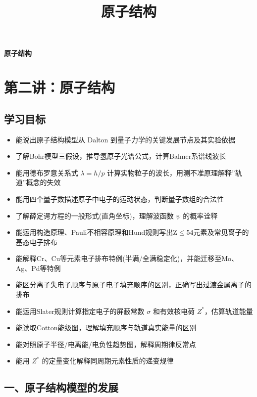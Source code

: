 \documentclass[a4paper,11pt]{ctexart}
\title{原子结构}
\date{}
\providecommand{\tightlist}{\setlength{\itemsep}{0pt}\setlength{\parskip}{0pt}}
\newcommand{\箭}{\ensuremath{\rightarrow}}
\newcommand{\左箭}{\ensuremath{\leftarrow}}
\newcommand{\上箭}{\ensuremath{\uparrow}}
\newcommand{\下箭}{\ensuremath{\downarrow}}
\newcommand{\衡}{\ensuremath{\rightleftharpoons}}
\newcommand{\双箭}{\ensuremath{\leftrightarrow}}
\newcommand{\约等于}{\ensuremath{\approx}}
\newcommand{\小于等于}{\ensuremath{\leq}}
\newcommand{\大于等于}{\ensuremath{\geq}}
\newcommand{\不等于}{\ensuremath{\neq}}
\newcommand{\西格马}{\ensuremath{\sigma}}
\newcommand{\派}{\ensuremath{\pi}}
\begin{document}
\thispagestyle{plain}
\begin{center}
{\bfseries 原子结构\par}
\end{center}
\vspace{1em}
\section{第二讲：原子结构}\label{ux7b2cux4e8cux8bb2ux539fux5b50ux7ed3ux6784}

\subsection{学习目标}\label{ux5b66ux4e60ux76eeux6807}

\begin{itemize}
\tightlist
\item
  能说出原子结构模型从 Dalton 到量子力学的关键发展节点及其实验依据
\item
  了解Bohr模型三假设，推导氢原子光谱公式，计算Balmer系谱线波长
\item
  能用德布罗意关系式 \(\lambda = h/p\) 计算实物粒子的波长，用测不准原理解释''轨道''概念的失效
\item
  能用四个量子数描述原子中电子的运动状态，判断量子数组的合法性
\item
  了解薛定谔方程的一般形式(直角坐标)，理解波函数 \(\psi\) 的概率诠释
\item
  能运用构造原理、Pauli不相容原理和Hund规则写出Z\小于等于54元素及常见离子的基态电子排布
\item
  能解释Cr、Cu等元素电子排布特例(半满/全满稳定化)，并能迁移至Mo、Ag、Pd等特例
\item
  能区分离子失电子顺序与原子电子填充顺序的区别，正确写出过渡金属离子的排布
\item
  能运用Slater规则计算指定电子的屏蔽常数 \(\sigma\) 和有效核电荷 \(Z^*\)，估算轨道能量
\item
  能读取Cotton能级图，理解填充顺序与轨道真实能量的区别
\item
  能对照原子半径/电离能/电负性趋势图，解释周期律反常点
\item
  能用 \(Z^*\) 的定量变化解释同周期元素性质的递变规律
\end{itemize}

\subsection{一、原子结构模型的发展}\label{ux4e00ux539fux5b50ux7ed3ux6784ux6a21ux578bux7684ux53d1ux5c55}
\end{document}
